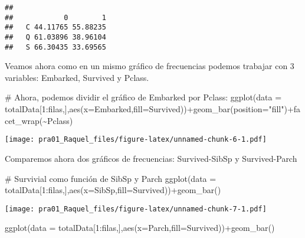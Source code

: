 \documentclass[]{article}
\newenvironment{Shaded}{\begin{snugshade}}{\end{snugshade}}
\newcommand{\CommentTok}[1]{\textcolor[rgb]{0.50,0.62,0.50}{#1}}
\newcommand{\DataTypeTok}[1]{\textcolor[rgb]{0.87,0.87,0.75}{#1}}
\newcommand{\DecValTok}[1]{\textcolor[rgb]{0.86,0.86,0.80}{#1}}
\newcommand{\KeywordTok}[1]{\textcolor[rgb]{0.94,0.87,0.69}{#1}}
\newcommand{\NormalTok}[1]{\textcolor[rgb]{0.80,0.80,0.80}{#1}}
\newcommand{\OperatorTok}[1]{\textcolor[rgb]{0.94,0.94,0.82}{#1}}
\newcommand{\StringTok}[1]{\textcolor[rgb]{0.80,0.58,0.58}{#1}}
\begin{document}
\begin{verbatim}
##    
##            0        1
##   C 44.11765 55.88235
##   Q 61.03896 38.96104
##   S 66.30435 33.69565
\end{verbatim}

Veamos ahora como en un mismo gráfico de frecuencias podemos trabajar
con 3 variables: Embarked, Survived y Pclass.

\begin{Shaded}
\begin{Highlighting}[]
\CommentTok{\# Ahora, podemos dividir el gráfico de Embarked por Pclass:}
\KeywordTok{ggplot}\NormalTok{(}\DataTypeTok{data =}\NormalTok{ totalData[}\DecValTok{1}\OperatorTok{:}\NormalTok{filas,],}\KeywordTok{aes}\NormalTok{(}\DataTypeTok{x=}\NormalTok{Embarked,}\DataTypeTok{fill=}\NormalTok{Survived))}\OperatorTok{+}\KeywordTok{geom\_bar}\NormalTok{(}\DataTypeTok{position=}\StringTok{"fill"}\NormalTok{)}\OperatorTok{+}\KeywordTok{facet\_wrap}\NormalTok{(}\OperatorTok{\textasciitilde{}}\NormalTok{Pclass)}
\end{Highlighting}
\end{Shaded}

\texttt{[image: pra01\_Raquel\_files/figure-latex/unnamed-chunk-6-1.pdf]}

Comparemos ahora dos gráficos de frecuencias: Survived-SibSp y
Survived-Parch

\begin{Shaded}
\begin{Highlighting}[]
\CommentTok{\# Survivial como función de SibSp y Parch}
\KeywordTok{ggplot}\NormalTok{(}\DataTypeTok{data =}\NormalTok{ totalData[}\DecValTok{1}\OperatorTok{:}\NormalTok{filas,],}\KeywordTok{aes}\NormalTok{(}\DataTypeTok{x=}\NormalTok{SibSp,}\DataTypeTok{fill=}\NormalTok{Survived))}\OperatorTok{+}\KeywordTok{geom\_bar}\NormalTok{()}
\end{Highlighting}
\end{Shaded}

\texttt{[image: pra01\_Raquel\_files/figure-latex/unnamed-chunk-7-1.pdf]}

\begin{Shaded}
\begin{Highlighting}[]
\KeywordTok{ggplot}\NormalTok{(}\DataTypeTok{data =}\NormalTok{ totalData[}\DecValTok{1}\OperatorTok{:}\NormalTok{filas,],}\KeywordTok{aes}\NormalTok{(}\DataTypeTok{x=}\NormalTok{Parch,}\DataTypeTok{fill=}\NormalTok{Survived))}\OperatorTok{+}\KeywordTok{geom\_bar}\NormalTok{()}
\end{Highlighting}
\end{Shaded}
\end{document}
